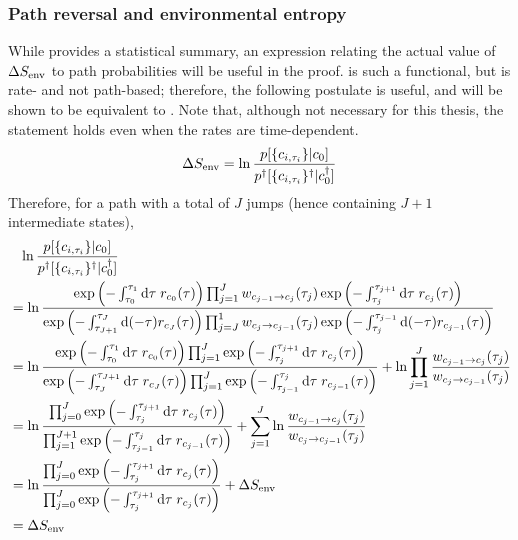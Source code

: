 \subsubsection{Path reversal and environmental entropy}

While  provides a statistical summary, an expression relating the actual value of \(\Delta S_\text{env}\) to path probabilities will be useful in the proof.  is such a functional, but is rate- and not path-based; therefore, the following postulate is useful, and will be shown to be equivalent to . Note that, although not necessary for this thesis, the statement holds even when the rates are time-dependent.
%
\begin{equation}
	\label{eqn:SEnv path functional}
	\Delta S_\text{env}
	= \ln\frac{p[\{c_{i,\tau_i}\}|c_0]}{p^\dagger[\{c_{i,\tau_i}\}^\dagger|c^\dagger_0]}
\end{equation}
%
Therefore, for a path with a total of \(J\) jumps (hence containing \(J+1\) intermediate states),
%
\begin{align*}
	&\phantom{=}
		\ln\frac{p[\{c_{i,\tau_i}\} | c_0]}{p^\dagger[\{c_{i,\tau_i}\}^\dagger | c_0^\dagger]}
	\\
	&=
		\ln\frac{
			\operatorname{exp}\left(-\int_{\tau_0}^{\tau_1}\mathrm{d}\tau\;r_{c_0}(\tau)\right)
			\prod_{j=1}^J
				w_{c_{j-1} \to c_j}(\tau_j)
				\operatorname{exp}\left(-\int_{\tau_j}^{\tau_{j+1}}\mathrm{d}\tau\;r_{c_j}(\tau)\right)
		}{
			\operatorname{exp}\left(-\int_{\tau_{J+1}}^{\tau_J}\mathrm{d}(-\tau)r_{c_J}(\tau)\right)
			\prod_{j=J}^1
				w_{c_j\to c_{j-1}}(\tau_j)
				\operatorname{exp}\left(-\int_{\tau_j}^{\tau_{j-1}}\mathrm{d}(-\tau)r_{c_{j-1}}(\tau)\right)
		}
	\\
	&=
		\ln\frac{
			\operatorname{exp}\left(-\int_{\tau_0}^{\tau_1}\mathrm{d}\tau\;r_{c_0}(\tau)\right)
			\prod_{j=1}^J
				\operatorname{exp}\left(-\int_{\tau_j}^{\tau_{j+1}}\mathrm{d}\tau\;r_{c_j}(\tau)\right)
		}{
			\operatorname{exp}\left(-\int_{\tau_J}^{\tau_{J+1}}\mathrm{d}\tau\;r_{c_J}(\tau)\right)
			\prod_{j=1}^J
				\operatorname{exp}\left(-\int_{\tau_{j-1}}^{\tau_j}\mathrm{d}\tau\;r_{c_{j-1}}(\tau)\right)
		}
		+ \ln\prod_{j=1}^J\frac{w_{c_{j-1}\to c_j}(\tau_j)}{w_{c_j\to c_{j-1}}(\tau_j)}
	\\
	&=
		\ln\frac{
			\prod_{j=0}^J
				\operatorname{exp}\left(-\int_{\tau_j}^{\tau_{j+1}}\mathrm{d}\tau\;r_{c_j}(\tau)\right)
		}{
			\prod_{j=1}^{J+1}
				\operatorname{exp}\left(-\int_{\tau_{j-1}}^{\tau_j}\mathrm{d}\tau\;r_{c_{j-1}}(\tau)\right)
		}
		+ \sum_{j=1}^J\ln\frac{w_{c_{j-1}\to c_j}(\tau_j)}{w_{c_j\to c_{j-1}}(\tau_j)}
	\\
	&=
		\ln\frac{
			\prod_{j=0}^J
				\operatorname{exp}\left(-\int_{\tau_j}^{\tau_{j+1}}\mathrm{d}\tau\;r_{c_j}(\tau)\right)
		}{
			\prod_{j=0}^J
				\operatorname{exp}\left(-\int_{\tau_j}^{\tau_{j+1}}\mathrm{d}\tau\;r_{c_j}(\tau)\right)
		}
		+ \Delta S_\text{env}
	\\
	&=
		\Delta S_\text{env}
\end{align*}
